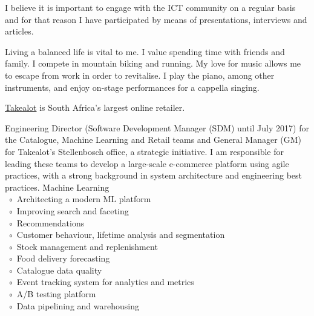 \documentclass[10pt,a4paper,final]{columncv}
\newcommand{\cvitembullet}{~$\circ$~}
\begin{document}
I believe it is important to engage with the ICT community on a regular basis and for that reason 
I have participated by means of presentations, interviews and articles. 

Living a balanced life is vital to me. I value spending time with friends and family. I compete in 
mountain biking and running. My love for music allows me to escape from work in order to 
revitalise. I play the piano, among other instruments, and enjoy on-stage performances for 
a cappella singing.

\pagebreak

\noindent \href{http://www.takealot.com/}{Takealot} is South Africa's largest online retailer. 

\begin{cvenv}
         {Engineering Director (Software Development Manager (SDM) until July 2017) 
          for the Catalogue, Machine Learning and Retail teams and General Manager (GM) 
          for Takealot's Stellenbosch office, a strategic initiative. I am responsible for 
          leading these teams to develop a large-scale e-commerce platform using agile practices, 
          with a strong background in system architecture and engineering best practices.}
         {Machine Learning \\
            \cvitembullet Architecting a modern ML platform \\
            \cvitembullet Improving search and faceting \\
            \cvitembullet Recommendations \\
            \cvitembullet Customer behaviour, lifetime analysis and segmentation \\
            \cvitembullet Stock management and replenishment \\
            \cvitembullet Food delivery forecasting \\
            \cvitembullet Catalogue data quality \\
            \cvitembullet Event tracking system for analytics and metrics \\
            \cvitembullet A/B testing platform \\
            \cvitembullet Data pipelining and warehousing \\
}
\end{cvenv}
\end{document}
